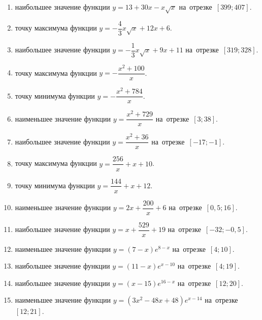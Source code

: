 \documentclass[a4paper,10pt]{article}
\begin{document}
\begin{enumerate}
\item {} наибольшее значение функции $y=13+30x -x\sqrt{x}$ на~отрезке~$\left[399;407\right]$.

\item {} точку максимума функции $y=-\dfrac{4}{3}x\sqrt{x} +12x+6$.

\item {} наибольшее значение функции $y=-\dfrac{1}{3}x\sqrt{x} +9x+11$ на~отрезке~$\left[319;328\right]$.

\item {} точку максимума функции $y=-\dfrac{x^2 +100}{x}$.

\item {} точку минимума функции $y=-\dfrac{x^2 +784}{x}$.

\item {} наименьшее значение функции $y=\dfrac{x^2 +729}{x}$ на~отрезке~$\left[3;38\right]$.

\item {} наибольшее значение функции $y=\dfrac{x^2 +36}{x}$ на~отрезке~$\left[-17;-1\right]$.

\item {} точку максимума функции $y=\dfrac{256}{x} +x+10$.

\item {} точку минимума функции $y=\dfrac{144}{x} +x+12$.

\item {} наименьшее значение функции $y=2x+\dfrac{200}{x} +6$ на~отрезке~$\left[0,5;16\right]$.

\item {} наибольшее значение функции $y=x+\dfrac{529}{x} +19$ на~отрезке~$\left[-32;-0,5\right]$.

\item {} наименьшее значение функции $y=\left(7-x\right)e^{8-x}$ на~отрезке~$\left[4;10\right]$.

\item {} наибольшее значение функции $y=\left(11-x\right)e^{x-10}$ на~отрезке~$\left[4;19\right]$.

\item {} наибольшее значение функции $y=\left(x-15\right)e^{16-x}$ на~отрезке~$\left[12;20\right]$.

\item {} наименьшее значение функции $y=\left(3x^2 -48x +48\right)e^{x -14}$ на~отрезке~$\left[12;21\right]$.


\end{enumerate}
\end{document}
